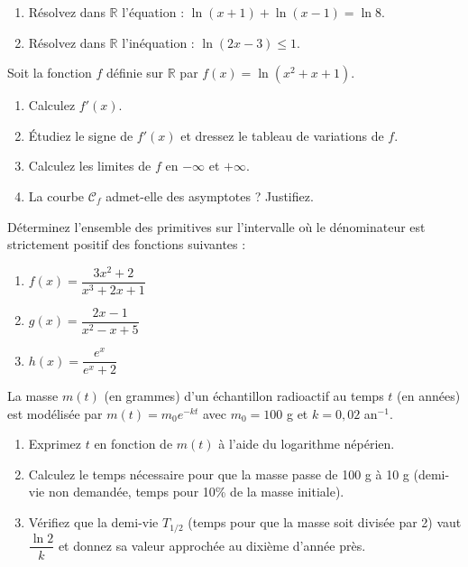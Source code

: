 \documentclass[11pt]{article}
\newcounter{popsec}
\newcounter{popsub}
\newcommand{\courssub}[1]{%
  \stepcounter{popsub}%
  \par\vspace{9pt}\noindent{\popxbold\fontsize{11.5}{13}\selectfont\color{popink}{\color{poporange}\thepopsec.\thepopsub}\hspace{6pt}#1}\par\nopagebreak\vspace{4pt}
}
\begin{document}
\courssub{Je m'entraîne}

\begin{exercice}
\begin{enumerate}
    \item Résolvez dans $\mathbb{R}$ l'équation : $\ln(x+1) + \ln(x-1) = \ln 8$.
    \item Résolvez dans $\mathbb{R}$ l'inéquation : $\ln(2x-3) \le 1$.
\end{enumerate}
\end{exercice}

\begin{exercice}[Étude de fonction : $f(x) = \ln(x^2+x+1)$]
Soit la fonction $f$ définie sur $\mathbb{R}$ par $f(x) = \ln(x^2+x+1)$.
\begin{enumerate}
    \item Calculez $f'(x)$.
    \item Étudiez le signe de $f'(x)$ et dressez le tableau de variations de $f$.
    \item Calculez les limites de $f$ en $-\infty$ et $+\infty$.
    \item La courbe $\mathcal{C}_f$ admet-elle des asymptotes ? Justifiez.
\end{enumerate}
\end{exercice}

\begin{exercice}
Déterminez l'ensemble des primitives sur l'intervalle où le dénominateur est strictement positif des fonctions suivantes :
\begin{enumerate}
    \item $f(x) = \dfrac{3x^2+2}{x^3+2x+1}$
    \item $g(x) = \dfrac{2x-1}{x^2-x+5}$
    \item $h(x) = \dfrac{e^x}{e^x+2}$
\end{enumerate}
\end{exercice}

\begin{exercice}
La masse $m(t)$ (en grammes) d'un échantillon radioactif au temps $t$ (en années) est modélisée par $m(t) = m_0 e^{-kt}$ avec $m_0=100$ g et $k=0,02$ an$^{-1}$.
\begin{enumerate}
    \item Exprimez $t$ en fonction de $m(t)$ à l'aide du logarithme népérien.
    \item Calculez le temps nécessaire pour que la masse passe de 100 g à 10 g (demi-vie non demandée, temps pour 10\% de la masse initiale).
    \item Vérifiez que la demi-vie $T_{1/2}$ (temps pour que la masse soit divisée par 2) vaut $\dfrac{\ln 2}{k}$ et donnez sa valeur approchée au dixième d'année près.
\end{enumerate}
\end{exercice}
\end{document}
